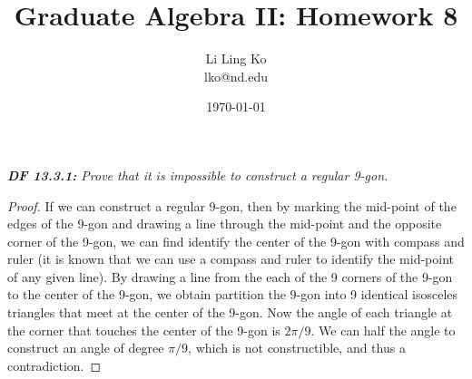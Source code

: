 \documentclass{article}
\begin{document}
\title{Graduate Algebra II: Homework 8}
\author{Li Ling Ko\\ lko@nd.edu}
\date{\today}
\maketitle

\it \textbf{DF 13.3.1:} Prove that it is impossible to construct a regular
  9-gon.

  \begin{proof}
    If we can construct a regular 9-gon, then by marking the mid-point of
    the edges of the 9-gon and drawing a line through the mid-point and the
    opposite corner of the 9-gon, we can find identify the center of the
    9-gon with compass and ruler (it is known that we can use a compass and
    ruler to identify the mid-point of any given line). By drawing a line
    from the each of the 9 corners of the 9-gon to the center of the
    9-gon, we obtain partition the 9-gon into 9 identical isosceles
    triangles that meet at the center of the 9-gon. Now the angle of each
    triangle at the corner that touches the center of the 9-gon is
    $2\pi/9$. We can half the angle to construct an angle of degree
    $\pi/9$, which is not constructible, and thus a contradiction.
  \end{proof}
\end{document}
